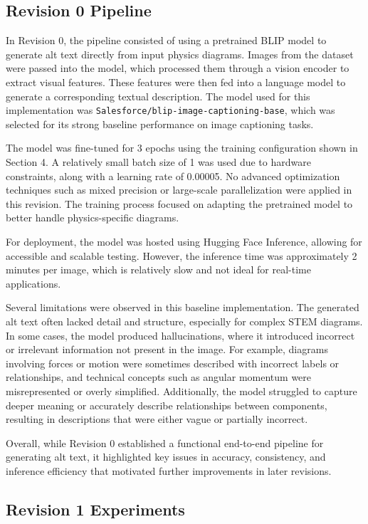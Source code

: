 \documentclass[11pt]{article}
\begin{document}
\subsection{Revision 0 Pipeline}
In Revision 0, the pipeline consisted of using a pretrained BLIP model to generate alt text directly from input 
physics diagrams. Images from the dataset were passed into the model, which processed them through a vision encoder 
to extract visual features. These features were then fed into a language model to generate a corresponding textual description. 
The model used for this implementation was \texttt{Salesforce/blip-image-captioning-base}, which was selected for its 
strong baseline performance on image captioning tasks.

The model was fine-tuned for 3 epochs using the training configuration shown in Section 4. A relatively small batch size of 
1 was used due to hardware constraints, along with a learning rate of 0.00005. No advanced optimization techniques such as mixed precision or large-scale parallelization were applied in this revision. 
The training process focused on adapting the pretrained model to better handle physics-specific diagrams.

For deployment, the model was hosted using Hugging Face Inference, allowing for accessible and scalable testing. However, 
the inference time was approximately 2 minutes per image, which is relatively slow and not ideal for real-time applications.

Several limitations were observed in this baseline implementation. The generated alt text often lacked detail and structure, 
especially for complex STEM diagrams. In some cases, the model produced hallucinations, where it introduced incorrect or irrelevant 
information not present in the image. For example, diagrams involving forces or motion were sometimes described with incorrect labels or relationships, 
and technical concepts such as angular momentum were misrepresented or overly simplified. Additionally, the model struggled to capture deeper 
meaning or accurately describe relationships between components, resulting in descriptions that were either vague or partially incorrect.

Overall, while Revision 0 established a functional end-to-end pipeline for generating alt text, it highlighted key issues in accuracy, consistency, 
and inference efficiency that motivated further improvements in later revisions.

\subsection{Revision 1 Experiments}
\end{document}
